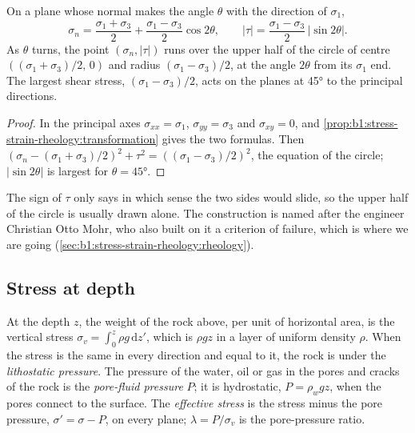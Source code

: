 \begin{proposition}\label{prop:b1:stress-strain-rheology:mohr}
On a plane whose normal makes the angle $\theta$ with the direction of
$\sigma_1$,
\[
  \sigma_n = \frac{\sigma_1+\sigma_3}{2} + \frac{\sigma_1-\sigma_3}{2}\cos2\theta,
  \qquad
  |\tau| = \frac{\sigma_1-\sigma_3}{2}\,|\sin2\theta| .
\]
As $\theta$ turns, the point $(\sigma_n, |\tau|)$ runs over the upper half of
the circle of centre $((\sigma_1+\sigma_3)/2,\, 0)$ and radius
$(\sigma_1-\sigma_3)/2$, at the angle $2\theta$ from its $\sigma_1$ end. The
largest shear stress, $(\sigma_1-\sigma_3)/2$, acts on the planes at
\ang{45} to the principal directions.
\end{proposition}

\begin{proof}
In the principal axes $\sigma_{xx} = \sigma_1$, $\sigma_{yy} = \sigma_3$ and
$\sigma_{xy} = 0$, and \cref{prop:b1:stress-strain-rheology:transformation}
gives the two formulas. Then
$(\sigma_n - (\sigma_1+\sigma_3)/2)^2 + \tau^2 = ((\sigma_1-\sigma_3)/2)^2$, the
equation of the circle; $|\sin2\theta|$ is largest for $\theta = \ang{45}$.
\end{proof}

The sign of $\tau$ only says in which sense the two sides would slide, so the
upper half of the circle is usually drawn alone. The construction is named
after the engineer Christian Otto Mohr, who also built on it a criterion of
failure, which is where we are going
(\cref{sec:b1:stress-strain-rheology:rheology}).

\subsection*{Stress at depth}

\begin{definition}\label{def:b1:stress-strain-rheology:lithostatic}
At the depth $z$, the weight of the rock above, per unit of horizontal area,
is the vertical stress $\sigma_v = \int_0^z\rho g\,\mathrm dz'$, which is
$\rho g z$ in a layer of uniform density $\rho$. When the stress is the same
in every direction and equal to it, the rock is under the \emph{lithostatic
pressure}. The pressure of the water, oil or gas
in the pores and cracks of the rock is the \emph{pore-fluid
pressure} $P$; it is hydrostatic,
$P = \rho_w g z$, when the pores connect to the surface. The
\emph{effective stress} is the stress minus the pore
pressure, $\sigma' = \sigma - P$, on every plane; $\lambda = P/\sigma_v$ is the
pore-pressure ratio.
\end{definition}

